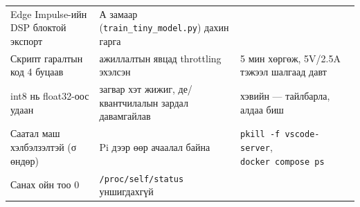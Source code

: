 \begin{longtable}[]{@{}lll@{}}
\begin{minipage}[t]{0.30\columnwidth}
Edge Impulse-ийн DSP блоктой экспорт\strut
\end{minipage} & \begin{minipage}[t]{0.30\columnwidth}\raggedright
А замаар (\texttt{train\_\allowbreak{}tiny\_\allowbreak{}model.\allowbreak{}py}) дахин гарга\strut
\end{minipage}\tabularnewline
\begin{minipage}[t]{0.30\columnwidth}\raggedright
Скрипт гаралтын код 4 буцаав\strut
\end{minipage} & \begin{minipage}[t]{0.30\columnwidth}\raggedright
ажиллалтын явцад throttling эхэлсэн\strut
\end{minipage} & \begin{minipage}[t]{0.30\columnwidth}\raggedright
5 мин хөргөж, 5V/2.5A тэжээл шалгаад давт\strut
\end{minipage}\tabularnewline
\begin{minipage}[t]{0.30\columnwidth}\raggedright
int8 нь float32-оос удаан\strut
\end{minipage} & \begin{minipage}[t]{0.30\columnwidth}\raggedright
загвар хэт жижиг, де/квантчилалын зардал давамгайлав\strut
\end{minipage} & \begin{minipage}[t]{0.30\columnwidth}\raggedright
хэвийн --- тайлбарла, алдаа биш\strut
\end{minipage}\tabularnewline
\begin{minipage}[t]{0.30\columnwidth}\raggedright
Саатал маш хэлбэлзэлтэй (σ өндөр)\strut
\end{minipage} & \begin{minipage}[t]{0.30\columnwidth}\raggedright
Pi дээр өөр ачаалал байна\strut
\end{minipage} & \begin{minipage}[t]{0.30\columnwidth}\raggedright
\texttt{pkill\ -f\ vscode-server}, \texttt{docker\ compose\ ps}\strut
\end{minipage}\tabularnewline
\begin{minipage}[t]{0.30\columnwidth}\raggedright
Санах ойн тоо 0\strut
\end{minipage} & \begin{minipage}[t]{0.30\columnwidth}\raggedright
\texttt{/\allowbreak{}proc/\allowbreak{}self/\allowbreak{}status} уншигдахгүй\strut
\end{minipage} & \begin{minipage}[t]{0.30\columnwidth}\raggedright

\end{minipage}
\end{longtable}
